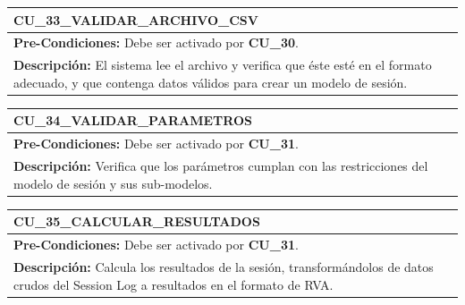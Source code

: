 \begin{center}
  \begin{tabular}{| p{7.5cm} | p{7.5cm} |}
    \hline
    \multicolumn{2}{|p{15cm}|}{\textbf{CU\_33\_VALIDAR\_ARCHIVO\_CSV}} \\ \hline
    \multicolumn{2}{|p{15cm}|}{\textbf{Pre-Condiciones:} Debe ser activado por \textbf{CU\_30}.} \\ \hline
    \multicolumn{2}{|p{15cm}|}{\textbf{Descripción:} El sistema lee el archivo y verifica que éste esté en el formato adecuado, y que contenga datos válidos para crear un modelo de sesión.} \\
    \hline
  \end{tabular}
  
  \label{table:usecase:33}
\end{center}

\begin{center}
  \begin{tabular}{| p{7.5cm} | p{7.5cm} |}
    \hline
    \multicolumn{2}{|p{15cm}|}{\textbf{CU\_34\_VALIDAR\_PARAMETROS}} \\ \hline
    \multicolumn{2}{|p{15cm}|}{\textbf{Pre-Condiciones:} Debe ser activado por \textbf{CU\_31}.} \\ \hline
    \multicolumn{2}{|p{15cm}|}{\textbf{Descripción:} Verifica que los parámetros cumplan con las restricciones del modelo de sesión y sus sub-modelos.} \\
    \hline
  \end{tabular}
  
  \label{table:usecase:34}
\end{center}

\begin{center}
  \begin{tabular}{| p{7.5cm} | p{7.5cm} |}
    \hline
    \multicolumn{2}{|p{15cm}|}{\textbf{CU\_35\_CALCULAR\_RESULTADOS}} \\ \hline
    \multicolumn{2}{|p{15cm}|}{\textbf{Pre-Condiciones:} Debe ser activado por \textbf{CU\_31}.} \\ \hline
    \multicolumn{2}{|p{15cm}|}{\textbf{Descripción:} Calcula los resultados de la sesión, transformándolos de datos crudos del Session Log a resultados en el formato de RVA.} \\
    \hline
  \end{tabular}
  
  \label{table:usecase:35}
\end{center}

